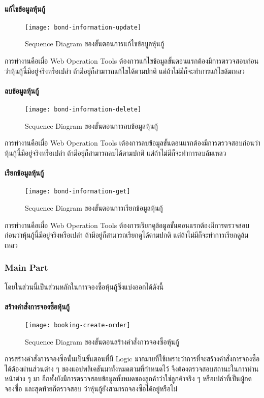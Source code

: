\paragraph{แก้ไขข้อมูลหุ้นกู้}
\begin{figure}[H]
    \centering
    \texttt{[image: bond-information-update]}
    \caption{Sequence Diagram ของขั้นตอนการแก้ไขข้อมูลหุ้นกู้}\label{bond-information-update}
\end{figure}
การทำงานคือเมื่อ Web Operation Tools ต้องการแก้ไขข้อมูลขั้นตอนแรกต้องมีการตรวจสอบก่อนว่าหุ้นกู้นี้มีอยู่จริงหรือเปล่า
ถ้ามีอยู่ก็สามารถแก้ไขได้ตามปกติ แต่ถ้าไม่มีก็จะทำการแก้ไขล้มเหลว

\paragraph{ลบข้อมูลหุ้นกู้}
\begin{figure}[H]
    \centering
    \texttt{[image: bond-information-delete]}
    \caption{Sequence Diagram ของขั้นตอนการลบข้อมูลหุ้นกู้}\label{bond-information-delete}
\end{figure}
การทำงานคือเมื่อ Web Operation Tools เต้องการลบข้อมูลขั้นตอนแรกต้องมีการตรวจสอบก่อนว่าหุ้นกู้นี้มีอยู่จริงหรือเปล่า
ถ้ามีอยู่ก็สามารถลบได้ตามปกติ แต่ถ้าไม่มีก็จะทำการลบล้มเหลว

\paragraph{เรียกข้อมูลหุ้นกู้}
\begin{figure}[H]
    \centering
    \texttt{[image: bond-information-get]}
    \caption{Sequence Diagram ของขั้นตอนการเรียกข้อมูลหุ้นกู้}\label{bond-information-get}
\end{figure}
การทำงานคือเมื่อ Web Operation Tools ต้องการเรียกดูข้อมูลขั้นตอนแรกต้องมีการตรวจสอบก่อนว่าหุ้นกู้นี้มีอยู่จริงหรือเปล่า
ถ้ามีอยู่ก็สามารถเรียกดูได้ตามปกติ แต่ถ้าไม่มีก็จะทำการเรียกดูล้มเหลว

\newpage
\subsubsection{Main Part}
โดยในส่วนนี้เป็นส่วนหลักในการจองซื้อหุ้นกู้ซึ่งแบ่งออกได้ดังนี้

\paragraph{สร้างคำสั่งการจองซื้อหุ้นกู้}
\begin{figure}[H]
    \centering
    \texttt{[image: booking-create-order]}
    \caption{Sequence Diagram ของขั้นตอนสร้างคำสั่งการจองซื้อหุ้นกู้}\label{booking-create-order}
\end{figure}
การสร้างคำสั่งการจองซื้อนั้นเป็นขั้นตอนที่มี Logic มากมายที่ใช้เพราะว่าการที่จะสร้างคำสั่งการจองซื้อได้ต้องผ่านส่วนต่าง ๆ ของแอปพลิเคชันมาทั้งหมดตามที่กำหนดไว้
จึงต้องตรวจสอบสถานะในการผ่านหน้าต่าง ๆ มา อีกทั้งยังมีการตรวจสอบข้อมูลทั้งหมดของลูกค้าว่าใช่ลูกค้าจริง ๆ หรือเปล่าที่เป็นผู้กดจองซื่้อ และสุดท้ายก็ตรวจสอบ
ว่าหุ้นกู้ยังสามารถจองซื้อได้อยู่หรือไม่

